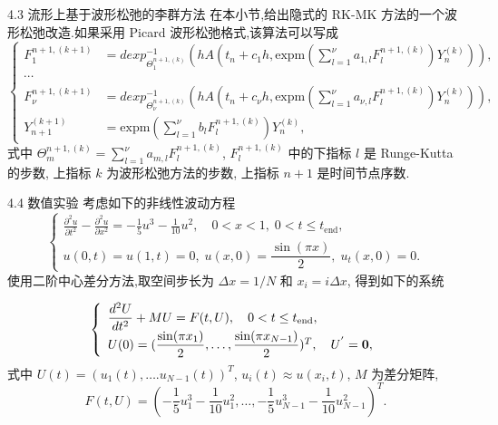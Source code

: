 \documentclass{beamer}
\begin{document}
\begin{frame}{4.3 流形上基于波形松弛的李群方法}
\qquad 在本小节,给出隐式的 RK-MK 方法的一个波形松弛改造.如果采用 Picard 波形松弛格式,该算法可以写成
\begin{equation*}
	\left\lbrace\begin{aligned}
		F_1^{n+1,(k+1)}&=dexp_{\Theta_1^{n+1,(k)}}^{-1}(hA(t_n+c_1h,\mbox{expm}(\sum_{l=1}^{\nu}a_{1,l}F_l^{n+1,(k)})Y_n^{(k)})),\\
		\cdots \\
		F_{\nu}^{n+1,(k+1)}&=dexp_{\Theta_{\nu}^{n+1,(k)}}^{-1}(hA(t_n+c_{\nu}h,\mbox{expm}(\sum_{l=1}^{\nu}a_{\nu,l}F_l^{n+1,(k)})Y_n^{(k)})),\\
		Y_{n+1}^{(k+1)}&=\mbox{expm}(\sum_{l=1}^{\nu}b_lF_l^{n+1,(k)})Y_n^{(k)},
	\end{aligned}\right.
\end{equation*}
式中 $\Theta_m^{n+1,(k)} = \sum_{l=1}^{\nu}a_{m,l}F_l^{n+1,(k)}$, $F_l^{n+1,(k)}$ 中的下指标 $l$ 是 Runge-Kutta 的步数, 上指标 $k$ 为波形松弛方法的步数, 上指标 $n+1$ 是时间节点序数.
\end{frame}

\begin{frame}{4.4 数值实验}
考虑如下的非线性波动方程
\begin{equation}\label{eq:nonlinwave}
  \left \{ \begin{array}{l}
      \displaystyle \frac{\partial^2 u }{\partial t^2}
      - \frac{\partial^2 u}{\partial x^2}
      = -\frac{1}{5} u^3 - \frac{1}{10} u^2, \quad 0<x<1, \; 0<t \leq t_{\text{end}},\\
      u(0,t) = u(1,t) = 0, \; u(x, 0) = \dfrac{\sin(\pi x)}{2}, \; u_t (x, 0) = 0.
    \end{array} \right.
\end{equation}
使用二阶中心差分方法,取空间步长为 $\Delta x = 1/N$ 和 $x_i = i \Delta x$, 得到如下的系统

\begin{equation*}
  \left \{ \begin{array}{l}
      \displaystyle \frac{d^2 U }{d t^2} + MU =F(t, U), \quad 0<t \leq t_{\text{end}},\\
      U(0) = (\dfrac{\sin(\pi x_1)}{2}, \ldots, \dfrac{\sin(\pi x_{N-1})}{2})^{T}, \quad U^{'} ={\bf 0},
    \end{array} \right.
\end{equation*}
式中 $U(t)=(u_1(t), \ldots. u_{N-1}(t))^{T}$, $u_i(t) \approx u(x_i,t)$, $M$ 为差分矩阵,
\begin{equation*}
  F(t,U) = \left( -\frac{1}{5}u_1^3 -\frac{1}{10}u_1^2, \ldots,
    -\frac{1}{5}u_{N-1}^3 -\frac{1}{10}u_{N-1}^2 \right)^{T}.
\end{equation*}
\end{frame}
\end{document}
